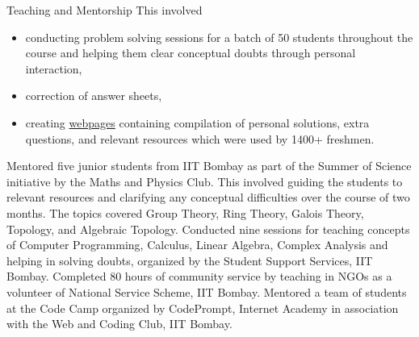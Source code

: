\begin{rubric}{Teaching and Mentorship}
	This involved
		\vspace{-3mm}
	\begin{itemize}%
		\setlength\itemsep{-0.4em}
		\item conducting problem solving sessions for a batch of 50 students throughout the course and helping them clear conceptual doubts through personal interaction,
		\item correction of answer sheets,
		\item creating \href{http://aryamanmaithani.github.io/tuts/}{webpages} containing compilation of personal solutions, extra questions, and relevant resources which were used by 1400+ freshmen. \vspace{-2mm}
	\end{itemize}
	\entry*[2021] Mentored five junior students from IIT Bombay as part of the Summer of Science initiative by the Maths and Physics Club. This involved guiding the students to relevant resources and clarifying any conceptual difficulties over the course of two months. The topics covered Group Theory, Ring Theory, Galois Theory, Topology, and Algebraic Topology.
	\entry*[2020] Conducted nine sessions for teaching concepts of Computer Programming, Calculus, Linear Algebra, Complex Analysis and helping in solving doubts, organized by the Student Support Services, IIT Bombay. 
	\entry*[2019] Completed 80 hours of community service by teaching in NGOs as a volunteer of National Service Scheme, IIT Bombay.
	\entry*[2018] Mentored a team of students at the Code Camp organized by CodePrompt, Internet Academy in association with the Web and Coding Club, IIT Bombay.
\end{rubric}
